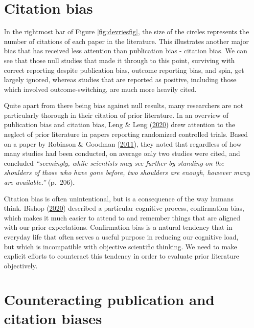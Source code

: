 \documentclass{krantz}
\begin{document}
\hypertarget{citation-bias}{%
\section{Citation bias}\label{citation-bias}}

In the rightmost bar of Figure \ref{fig:devriesfig}, the size of the circles represents the number of citations of each paper in the literature. This illustrates another major bias that has received less attention than publication bias - citation bias. We can see that those null studies that made it through to this point, surviving with correct reporting despite publication bias, outcome reporting bias, and spin, get largely ignored, whereas studies that are reported as positive, including those which involved outcome-switching, are much more heavily cited.

Quite apart from there being bias against null results, many researchers are not particularly thorough in their citation of prior literature. In an overview of publication bias and citation bias, Leng \& Leng (\protect\hyperlink{ref-leng2020}{2020}) drew attention to the neglect of prior literature in papers reporting randomized controlled trials. Based on a paper by Robinson \& Goodman (\protect\hyperlink{ref-robinson2011}{2011}), they noted that regardless of how many studies had been conducted, on average only two studies were cited, and concluded \emph{``seemingly, while scientists may see further by standing on the shoulders of those who have gone before, two shoulders are enough, however many are available.''} (p.~206).

Citation bias is often unintentional, but is a consequence of the way humans think. Bishop (\protect\hyperlink{ref-bishop2020}{2020}) described a particular cognitive process, confirmation bias, which makes it much easier to attend to and remember things that are aligned with our prior expectations. Confirmation bias is a natural tendency that in everyday life that often serves a useful purpose in reducing our cognitive load, but which is incompatible with objective scientific thinking. We need to make explicit efforts to counteract this tendency in order to evaluate prior literature objectively.

\hypertarget{counteracting-publication-and-citation-biases}{%
\section{Counteracting publication and citation biases}\label{counteracting-publication-and-citation-biases}}
\end{document}
